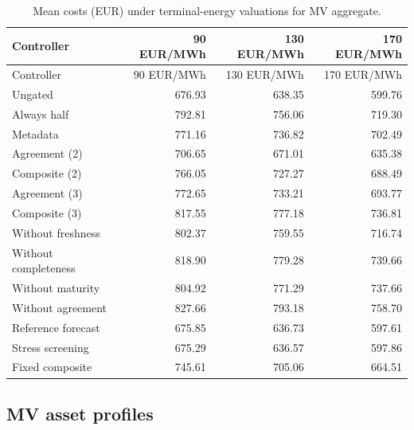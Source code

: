 \documentclass[11pt]{article}
\begin{document}
\small\begin{longtable}{lrrr}
\caption{Mean costs (EUR) under terminal-energy valuations for MV aggregate.}\\\toprule
Controller & 90 EUR/MWh & 130 EUR/MWh & 170 EUR/MWh\\\midrule
\endfirsthead
\toprule
Controller & 90 EUR/MWh & 130 EUR/MWh & 170 EUR/MWh\\\midrule
\endhead
\bottomrule\endfoot
Ungated & 676.93 & 638.35 & 599.76\\
Always half & 792.81 & 756.06 & 719.30\\
Metadata & 771.16 & 736.82 & 702.49\\
Agreement (2) & 706.65 & 671.01 & 635.38\\
Composite (2) & 766.05 & 727.27 & 688.49\\
Agreement (3) & 772.65 & 733.21 & 693.77\\
Composite (3) & 817.55 & 777.18 & 736.81\\
Without freshness & 802.37 & 759.55 & 716.74\\
Without completeness & 818.90 & 779.28 & 739.66\\
Without maturity & 804.92 & 771.29 & 737.66\\
Without agreement & 827.66 & 793.18 & 758.70\\
Reference forecast & 675.85 & 636.73 & 597.61\\
Stress screening & 675.29 & 636.57 & 597.86\\
Fixed composite & 745.61 & 705.06 & 664.51\\
\end{longtable}\normalsize
{}\subsection{MV asset profiles}
\end{document}
